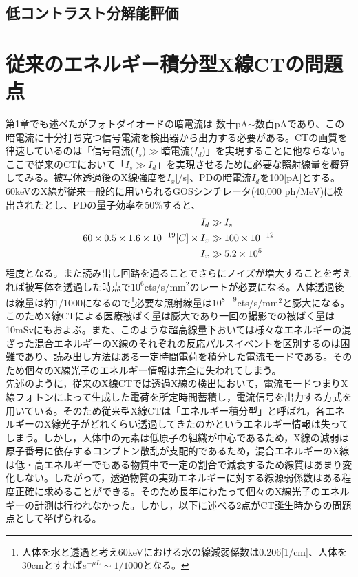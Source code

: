 \subsection{低コントラスト分解能評価}

\section{従来のエネルギー積分型X線CTの問題点\label{sec:problem}}

第1章でも述べたがフォトダイオードの暗電流は 数十pA$\sim$数百pAであり、この暗電流に十分打ち克つ信号電流を検出器から出力する必要がある。CTの画質を律速しているのは「信号電流($I_s$)$\gg$暗電流($I_d$)」を実現することに他ならない。ここで従来のCTにおいて「$I_s\gg I_d$」を実現させるために必要な照射線量を概算してみる。被写体透過後のX線強度を$I_x$[/s]、PDの暗電流$I_d$を100[pA]とする。60keVのX線が従来一般的に用いられるGOSシンチレータ(40,000 ph/MeV)に検出されたとし、PDの量子効率を50\%すると、
\begin{align}
I_d&\gg I_s\\
60\time40\times0.5\times1.6\times10^{-19} [C] \times I_x&\gg100\times10^{-12}\\
I_x&\gg 5.2\times10^5
\end{align}
程度となる。また読み出し回路を通ることでさらにノイズが増大することを考えれば被写体を透過した時点で$10^{6}$cts/s/mm$^2$のレートが必要になる。人体透過後は線量は約1/1000になるので\footnote{人体を水と透過と考え60keVにおける水の線減弱係数は0.206[1/cm]、人体を30cmとすれば$e^{-\mu L}\sim1/1000$となる。}必要な照射線量は$10^{8-9}$cts/s/mm$^2$と膨大になる。このためX線CTによる医療被ばく量は膨大であり一回の撮影での被ばく量は10mSvにもおよぶ。また、このような超高線量下おいては様々なエネルギーの混ざった混合エネルギーのX線のそれぞれの反応パルスイベントを区別するのは困難であり、読み出し方法はある一定時間電荷を積分した電流モードである。そのため個々のX線光子のエネルギー情報は完全に失われてしまう。\\




先述のように，従来のX線CTでは透過X線の検出において，電流モードつまりX線フォトンによって生成した電荷を所定時間蓄積し，電流信号を出力する方式を用いている。そのため従来型X線CTは「エネルギー積分型」と呼ばれ，各エネルギーのX線光子がどれくらい透過してきたのかというエネルギー情報は失ってしまう。しかし，人体中の元素は低原子の組織が中心であるため，X線の減弱は原子番号に依存するコンプトン散乱が支配的であるため，混合エネルギーのX線は低・高エネルギーでもある物質中で一定の割合で減衰するため線質はあまり変化しない。したがって，透過物質の実効エネルギーに対する線源弱係数はある程度正確に求めることができる。そのため長年にわたって個々のX線光子のエネルギーの計測は行われなかった。しかし，以下に述べる2点がCT誕生時からの問題点として挙げられる。

